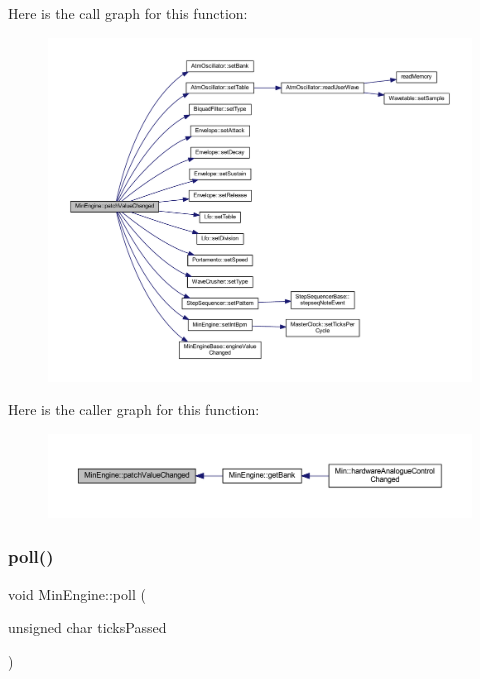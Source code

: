Here is the call graph for this function\+:
\nopagebreak
\begin{figure}[H]
\begin{center}
\leavevmode
\includegraphics[width=350pt]{class_min_engine_a229d4b913277a48909bf1aa01176ae1f_cgraph}
\end{center}
\end{figure}
Here is the caller graph for this function\+:
\nopagebreak
\begin{figure}[H]
\begin{center}
\leavevmode
\includegraphics[width=350pt]{class_min_engine_a229d4b913277a48909bf1aa01176ae1f_icgraph}
\end{center}
\end{figure}
\mbox{\label{class_min_engine_af0b91eca44954cb677808c3d24659596}} 
\subsubsection{\texorpdfstring{poll()}{poll()}}
{\footnotesize\ttfamily void Min\+Engine\+::poll (\begin{DoxyParamCaption}\item[{unsigned char}]{ticks\+Passed }\end{DoxyParamCaption})}



